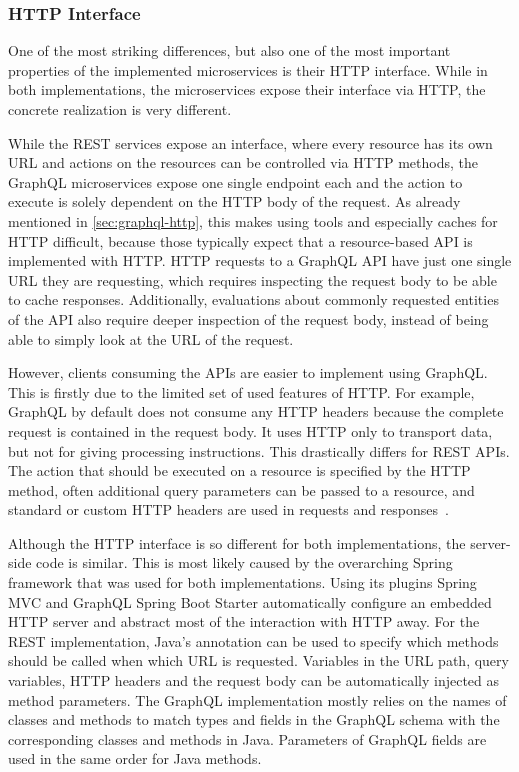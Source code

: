 \subsubsection{\acs{HTTP} Interface}

One of the most striking differences, but also one of the most important properties of the implemented microservices is their \ac{HTTP} interface.
While in both implementations, the microservices expose their interface via \ac{HTTP}, the concrete realization is very different.

While the \ac{REST} services expose an interface, where every resource has its own \ac{URL} and actions on the resources can be controlled via \ac{HTTP} methods, the GraphQL microservices expose one single endpoint each and the action to execute is solely dependent on the \ac{HTTP} body of the request.
As already mentioned in \autoref{sec:graphql-http}, this makes using tools and especially caches for \ac{HTTP} difficult, because those typically expect that a resource-based \ac{API} is implemented with \ac{HTTP}.
\ac{HTTP} requests to a GraphQL \ac{API} have just one single \ac{URL} they are requesting, which requires inspecting the request body to be able to cache responses.
Additionally, evaluations about commonly requested entities of the \ac{API} also require deeper inspection of the request body, instead of being able to simply look at the \ac{URL} of the request.

However, clients consuming the \acp{API} are easier to implement using GraphQL.~
This is firstly due to the limited set of used features of \ac{HTTP}.
For example, GraphQL by default does not consume any \ac{HTTP} headers because the complete request is contained in the request body.
It uses \ac{HTTP} only to transport data, but not for giving processing instructions.
This drastically differs for \ac{REST} \acp{API}.
The action that should be executed on a resource is specified by the \ac{HTTP} method, often additional query parameters can be passed to a resource, and standard or custom \ac{HTTP} headers are used in requests and responses~\cite{Buelthoff2019}.

Although the \ac{HTTP} interface is so different for both implementations, the server-side code is similar.
This is most likely caused by the overarching Spring framework that was used for both implementations.
Using its plugins Spring \acs{MVC} and GraphQL Spring Boot Starter automatically configure an embedded \ac{HTTP} server and abstract most of the interaction with \ac{HTTP} away.
For the \ac{REST} implementation, Java's annotation can be used to specify which methods should be called when which \ac{URL} is requested.
Variables in the \ac{URL} path, query variables, \ac{HTTP} headers and the request body can be automatically injected as method parameters.
The GraphQL implementation mostly relies on the names of classes and methods to match types and fields in the GraphQL schema with the corresponding classes and methods in Java.
Parameters of GraphQL fields are used in the same order for Java methods.

